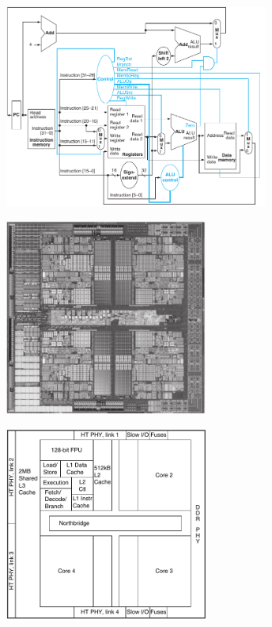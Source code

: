 \begin{frame}{}
\begin{center}
\includegraphics[width=0.65\textwidth, height=0.80\textheight]{docs/images/dp-cu}
\end{center}
\end{frame}

\begin{frame}{}
\begin{center}
\includegraphics[width=0.50\textwidth, height=0.80\textheight]{docs/images/amd-1}
\end{center}
\end{frame}

\begin{frame}{}
\begin{center}
\includegraphics[width=0.5\textwidth, height=0.80\textheight]{docs/images/amd-2}
\end{center}
\end{frame}

